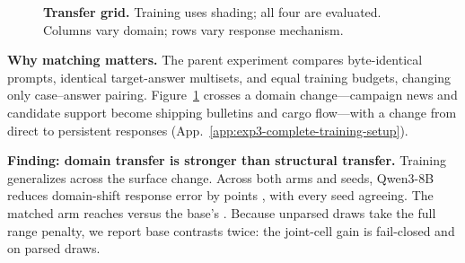 \documentclass{article}
\begin{document}
\begin{figure}
{%
}
\vspace{-0.3em}
\caption{\textbf{Transfer grid.} Training uses shading;
all four are evaluated. Columns vary domain; rows vary response mechanism.}
\label{fig:exp3-transfer-grid}
\vspace{0.1em}
\end{figure}

\textbf{Why matching matters.}
The parent experiment compares byte-identical prompts, identical target-answer
multisets, and equal training budgets, changing only case--answer pairing.
Figure~\ref{fig:exp3-transfer-grid} crosses a domain change---campaign news and
candidate support become shipping bulletins and cargo flow---with a change
from direct to persistent responses (App.~\ref{app:exp3-complete-training-setup}).

\noindent\textbf{Finding: domain transfer is stronger than structural transfer.}
Training generalizes across the surface change. Across both arms and
\eEightG{} seeds, Qwen3-8B reduces domain-shift response error by
\eEightDomainBaseGain{} points \eEightDomainBaseGainCi{}, with every seed agreeing.
The matched arm reaches \eEightDomainMatched{} versus the base's
\eEightDomainBase{}.
Because unparsed draws take the full
range penalty, we report base contrasts twice: the joint-cell gain is
\eEightJointBaseGain{} \eEightJointBaseGainCi{} fail-closed and
\eEightJointBaseGainParsed{} \eEightJointBaseGainParsedCi{} on parsed draws.
\end{document}
